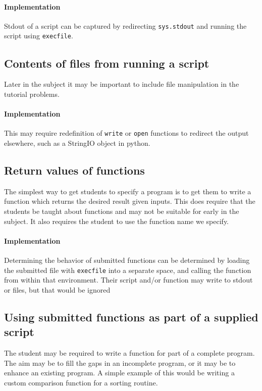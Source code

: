 \paragraph{Implementation} Stdout of a script can be captured by redirecting \texttt{sys.stdout} and running the script using \texttt{execfile}.

\subsection{Contents of files from running a script} \label{sec:filescript}
Later in the subject it may be important to include file manipulation in the tutorial problems.

\paragraph{Implementation} This may require redefinition of \texttt{write} or \texttt{open} functions to redirect the output elsewhere, such as a StringIO object in python.

\subsection{Return values of functions} \label{sec:retvalfunc}
The simplest way to get students to specify a program is to get them to write a function which returns the desired result given inputs. This does require that the students be taught about functions and may not be suitable for early in the subject. It also requires the student to use the function name we specify.

\paragraph{Implementation} Determining the behavior of submitted functions can be determined by loading the submitted file with \texttt{execfile} into a separate space, and calling the function from within that environment. Their script and/or function may write to stdout or files, but that would be ignored

\subsection{Using submitted functions as part of a supplied script}
The student may be required to write a function for part of a complete program. The aim may be to fill the gaps in an incomplete program, or it may be to enhance an existing program. A simple example of this would be writing a custom comparison function for a sorting routine.

